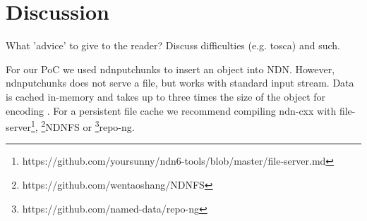 \section{Discussion}\label{disc}
What 'advice' to give to the reader? Discuss difficulties (e.g. tosca) and such.



For our PoC we used ndnputchunks to insert an object into NDN. However, ndnputchunks does not serve a file, but works with standard input stream. Data is cached in-memory and takes up to three times the size of the object for encoding \cite{ndnput-mem}. For a persistent file cache we recommend compiling ndn-cxx with file-server\footnote{https://github.com/yoursunny/ndn6-tools/blob/master/file-server.md}, \footnote{https://github.com/wentaoshang/NDNFS}NDNFS or \footnote{https://github.com/named-data/repo-ng}repo-ng.  